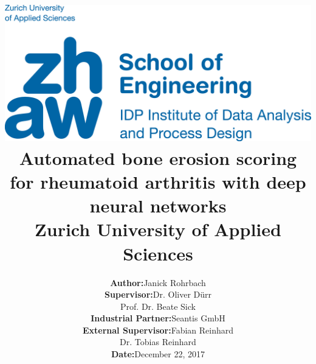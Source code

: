 \documentclass[12pt]{article}
\begin{document}
\title{
\vspace{-2.0cm}
\includegraphics{zhaw}\\ 
\vspace{3cm}
Automated bone erosion scoring for rheumatoid arthritis with deep neural networks\\
{\Large Zurich University of Applied Sciences}}
\author{\begin{tabular}{rl}
  \textbf{Author:} & Janick Rohrbach \\
  \textbf{Supervisor:} & Dr. Oliver Dürr \\ & Prof. Dr. Beate Sick \\
  \textbf{Industrial Partner:} & Seantis GmbH \\
  \textbf{External Supervisor:} & Fabian Reinhard \\ & Dr. Tobias Reinhard \\
  \textbf{Date:} & December 22, 2017 \\
  \hspace{6.0cm} & \hspace{6.0cm}
\end{tabular}}
\date{}
\maketitle

\newpage
\end{document}
